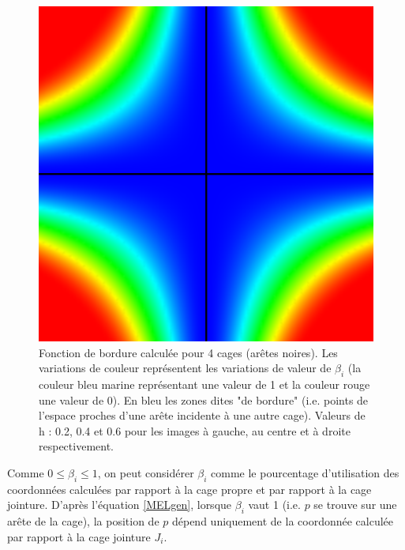 \begin{figure}[h]
\begin{center}
    \includegraphics[scale=0.35]{starCage-0-6}
    \caption{Fonction de bordure calculée pour 4 cages (arêtes
      noires). Les variations de couleur représentent les variations
      de valeur de $\beta_i$ (la couleur bleu marine représentant une
      valeur de 1 et la couleur rouge une valeur de 0). En bleu les
      zones dites "de bordure" (i.e. points de l'espace proches d'une
      arête incidente à une autre cage). Valeurs de h : 0.2, 0.4 et
      0.6 pour les images à gauche, au centre et à droite
      respectivement.}
    \label{MELpar}
  \end{center}
\end{figure}

Comme $0 \leq \beta_i \leq 1$, on peut considérer $\beta_i$ comme le
pourcentage d'utilisation des coordonnées calculées par rapport à la
cage propre et par rapport à la cage jointure. D'après l'équation
\ref{MELgen}, lorsque $\beta_i$ vaut 1 (i.e. $p$ se trouve sur une
arête de la cage), la position de $p$ dépend uniquement de la
coordonnée calculée par rapport à la cage jointure $J_i$.


